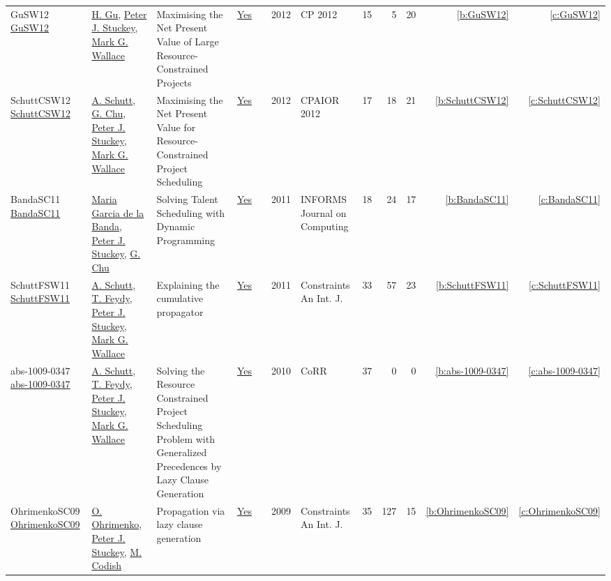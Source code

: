 {\begin{longtable}{>{\raggedright\arraybackslash}p{3cm}>{\raggedright\arraybackslash}p{6cm}>{\raggedright\arraybackslash}p{6.5cm}rrrp{2.5cm}rrrrr}
GuSW12 \href{https://doi.org/10.1007/978-3-642-33558-7\_55}{GuSW12} & \hyperref[auth:a342]{H. Gu}, \hyperref[auth:a126]{Peter J. Stuckey}, \hyperref[auth:a156]{Mark G. Wallace} & Maximising the Net Present Value of Large Resource-Constrained Projects & \href{../works/GuSW12.pdf}{Yes} & \cite{GuSW12} & 2012 & CP 2012 & 15 & 5 & 20 & \ref{b:GuSW12} & \ref{c:GuSW12}\\
SchuttCSW12 \href{https://doi.org/10.1007/978-3-642-29828-8\_24}{SchuttCSW12} & \hyperref[auth:a125]{A. Schutt}, \hyperref[auth:a349]{G. Chu}, \hyperref[auth:a126]{Peter J. Stuckey}, \hyperref[auth:a156]{Mark G. Wallace} & Maximising the Net Present Value for Resource-Constrained Project Scheduling & \href{../works/SchuttCSW12.pdf}{Yes} & \cite{SchuttCSW12} & 2012 & CPAIOR 2012 & 17 & 18 & 21 & \ref{b:SchuttCSW12} & \ref{c:SchuttCSW12}\\
BandaSC11 \href{https://doi.org/10.1287/ijoc.1090.0378}{BandaSC11} & \hyperref[auth:a808]{Maria Garcia de la Banda}, \hyperref[auth:a126]{Peter J. Stuckey}, \hyperref[auth:a349]{G. Chu} & Solving Talent Scheduling with Dynamic Programming & \href{../works/BandaSC11.pdf}{Yes} & \cite{BandaSC11} & 2011 & INFORMS Journal on Computing & 18 & 24 & 17 & \ref{b:BandaSC11} & \ref{c:BandaSC11}\\
SchuttFSW11 \href{https://doi.org/10.1007/s10601-010-9103-2}{SchuttFSW11} & \hyperref[auth:a125]{A. Schutt}, \hyperref[auth:a155]{T. Feydy}, \hyperref[auth:a126]{Peter J. Stuckey}, \hyperref[auth:a156]{Mark G. Wallace} & Explaining the cumulative propagator & \href{../works/SchuttFSW11.pdf}{Yes} & \cite{SchuttFSW11} & 2011 & Constraints An Int. J. & 33 & 57 & 23 & \ref{b:SchuttFSW11} & \ref{c:SchuttFSW11}\\
abs-1009-0347 \href{http://arxiv.org/abs/1009.0347}{abs-1009-0347} & \hyperref[auth:a125]{A. Schutt}, \hyperref[auth:a155]{T. Feydy}, \hyperref[auth:a126]{Peter J. Stuckey}, \hyperref[auth:a156]{Mark G. Wallace} & Solving the Resource Constrained Project Scheduling Problem with Generalized Precedences by Lazy Clause Generation & \href{../works/abs-1009-0347.pdf}{Yes} & \cite{abs-1009-0347} & 2010 & CoRR & 37 & 0 & 0 & \ref{b:abs-1009-0347} & \ref{c:abs-1009-0347}\\
OhrimenkoSC09 \href{http://dx.doi.org/10.1007/s10601-008-9064-x}{OhrimenkoSC09} & \hyperref[auth:a874]{O. Ohrimenko}, \hyperref[auth:a126]{Peter J. Stuckey}, \hyperref[auth:a875]{M. Codish} & Propagation via lazy clause generation & \href{../works/OhrimenkoSC09.pdf}{Yes} & \cite{OhrimenkoSC09} & 2009 & Constraints An Int. J. & 35 & 127 & 15 & \ref{b:OhrimenkoSC09} & \ref{c:OhrimenkoSC09}\\

\end{longtable}}
